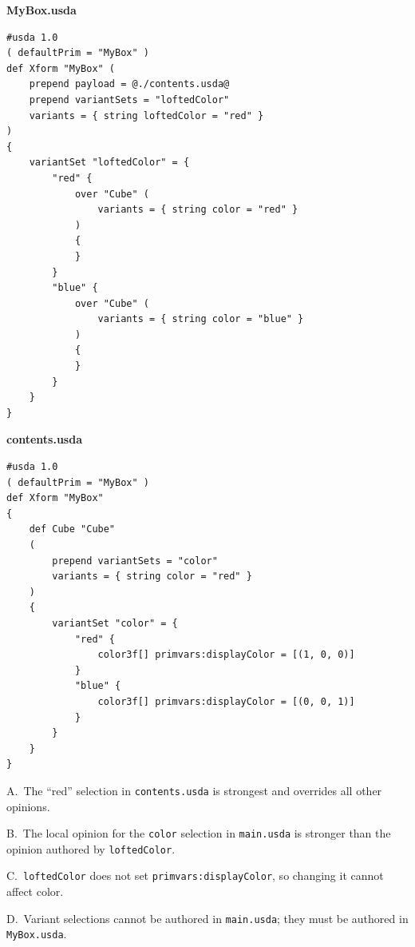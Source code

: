 \noindent\textbf{MyBox.usda}
\begin{lstlisting}
#usda 1.0
( defaultPrim = "MyBox" )
def Xform "MyBox" (
    prepend payload = @./contents.usda@
    prepend variantSets = "loftedColor"
    variants = { string loftedColor = "red" }
)
{
    variantSet "loftedColor" = {
        "red" {
            over "Cube" (
                variants = { string color = "red" }
            )
            {
            }
        }
        "blue" {
            over "Cube" (
                variants = { string color = "blue" }
            )
            {
            }
        }
    }
}
\end{lstlisting}

\noindent\textbf{contents.usda}
\begin{lstlisting}
#usda 1.0
( defaultPrim = "MyBox" )
def Xform "MyBox"
{
    def Cube "Cube"
    (
        prepend variantSets = "color"
        variants = { string color = "red" }
    )
    {
        variantSet "color" = {
            "red" {
                color3f[] primvars:displayColor = [(1, 0, 0)]
            }
            "blue" {
                color3f[] primvars:displayColor = [(0, 0, 1)]
            }
        }
    }
}
\end{lstlisting}

\begin{Choices}
  \item A.\ The “red” selection in \texttt{contents.usda} is strongest and overrides all other opinions.
  \item B.\ The local opinion for the \texttt{color} selection in
        \texttt{main.usda} is stronger than the opinion authored by
        \texttt{loftedColor}.
  \item C.\ \texttt{loftedColor} does not set \texttt{primvars:displayColor}, so changing it cannot affect color.
  \item D.\ Variant selections cannot be authored in \texttt{main.usda}; they must be authored in \texttt{MyBox.usda}.
\end{Choices}
